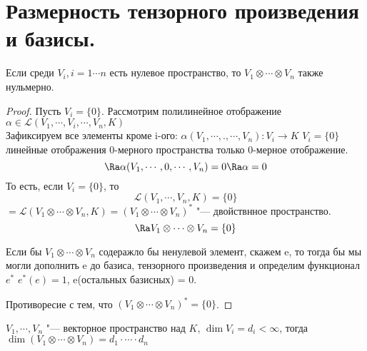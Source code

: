 ﻿\section{Размерность тензорного произведения и базисы.}

\begin{lemma}
Если среди $V_i,  i = 1 \cdots n$ есть нулевое пространство, 
то $V_1 \otimes \cdots \otimes V_n$  также нульмерно. 
\end{lemma}
\begin{proof}
    Пусть $V_i = \{0\}$. Рассмотрим полилинейное отображение 
    $\alpha \in \mathcal{L}(V_1, \cdots, V_i, \cdots, V_n, K)$\\
    Зафиксируем все элементы кроме i-ого: $\alpha(V_1, \cdots, ., \cdots, V_n) \colon V_i \to K$
    $V_i = \{0\}$ линейные отображения 0-мерного пространства только 0-мерное отображение. 
    $$\Ra \alpha(V_1, \cdots, 0, \cdots, V_n) = 0 \Ra \alpha = 0$$
    То есть, если $V_i = \{0\}$, то 
    $$\mathcal{L}(V_1, \cdots, V_n, K) = \{0\}$$
    $= \mathcal{L}(V_1 \otimes \cdots \otimes V_n, K) = (V_1 \otimes \cdots \otimes V_n)^*$ "--- двойствнное пространство. 
    $$\Ra V_1 \otimes \cdots \otimes V_n = \{0\}$$

    Если бы $V_1 \otimes \cdots \otimes V_n$ содеражло бы ненулевой элемент, скажем e, 
    то тогда бы мы могли дополнить e до базиса, тензорного произведения  и определим функционал $e^*$
    $e^*(e) = 1$, e(остальных базисных) = 0.

    Противоресие с тем, что $(V_1 \otimes \cdots \otimes V_n)^* = \{0\}$.
\end{proof}
\begin{theorem}
    $V_1, \cdots, V_n$ "--- векторное пространство над $K$, $\dim V_i = d_i < \infty$, 
    тогда $\dim(V_1 \otimes \cdots \otimes V_n) = d_1 \cdot \cdots \cdot d_n$
\end{theorem}
